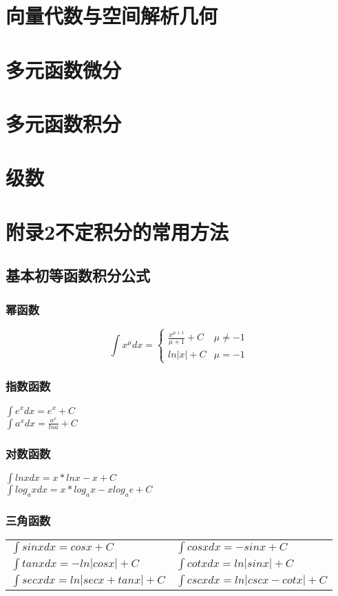 \documentclass[fleqn]{article}
\begin{document}
\begin{flushleft}
\section{向量代数与空间解析几何}
\section{多元函数微分}
\section{多元函数积分}
\section{级数}
\newpage
\section{附录2不定积分的常用方法} 
	\subsection{基本初等函数积分公式}
		\subsubsection{幂函数}
		\[
			\int x^\mu dx=
			\left \{
				\begin{array}{ll}
					\frac{x^{\mu+1}}{\mu + 1} + C & \mu \neq -1 \\
								 ln|x| + C & \mu =-1
				\end{array}
			\right. 
		\]
		\subsubsection{指数函数}
		$\int e^x dx=e^x+C$\\
		$\int a^x dx=\frac{a^x}{lna}+C$
		\subsubsection{对数函数}
		$\int lnx dx=x*lnx-x+C$\\
		$\int log_a x dx=x*log_a x -xlog_ae+C$
		\subsubsection{三角函数}
			\begin{tabular}{ll}
				$\int sinxdx=cosx+C$ & $\int cosxdx=-sinx+C$\\
				$\int tanxdx=-ln|cosx|+C$ & $\int cotxdx=ln|sinx|+C $\\
				$\int secxdx=ln|secx+tanx|+C $ & $\int cscxdx=ln|cscx-cotx|+C$
			\end{tabular}

\end{flushleft}
\end{document}
